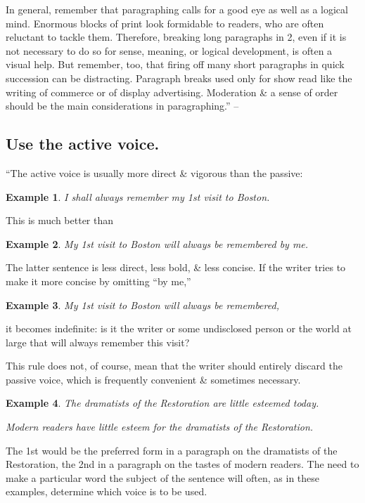 \documentclass{article}
\numberwithin{equation}{section}
\newtheorem{example}{Example}[section]
\begin{document}
In general, remember that paragraphing calls for a good eye as well as a logical mind. Enormous blocks of print look formidable to readers, who are often reluctant to tackle them. Therefore, breaking long paragraphs in 2, even if it is not necessary to do so for sense, meaning, or logical development, is often a visual help. But remember, too, that firing off many short paragraphs in quick succession can be distracting. Paragraph breaks used only for show read like the writing of commerce or of display advertising. Moderation \& a sense of order should be the main considerations in paragraphing.'' -- \cite[pp. 30--31]{Strunk_White2019}


\subsection{Use the active voice.}
``The active voice is usually more direct \& vigorous than the passive:
\begin{example}
	I shall always remember my 1st visit to Boston.
\end{example}
This is much better than
\begin{example}
	My 1st visit to Boston will always be remembered by me.
\end{example}
The latter sentence is less direct, less bold, \& less concise. If the writer tries to make it more concise by omitting ``by me,''
\begin{example}
	My 1st visit to Boston will always be remembered,
\end{example}
it becomes indefinite: is it the writer or some undisclosed person or the world at large that will always remember this visit?

This rule does not, of course, mean that the writer should entirely discard the passive voice, which is frequently convenient \& sometimes necessary.
\begin{example}
	The dramatists of the Restoration are little esteemed today.
	
	Modern readers have little esteem for the dramatists of the Restoration.
\end{example}
The 1st would be the preferred form in a paragraph on the dramatists of the Restoration, the 2nd in a paragraph on the tastes of modern readers. The need to make a particular word the subject of the sentence will often, as in these examples, determine which voice is to be used.
\end{document}
